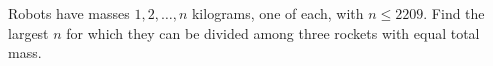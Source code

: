 Robots have masses $1,2,\ldots,n$ kilograms, one of each, with $n\le2209$. Find the largest $n$ for which they can be divided among three rockets with equal total mass.
